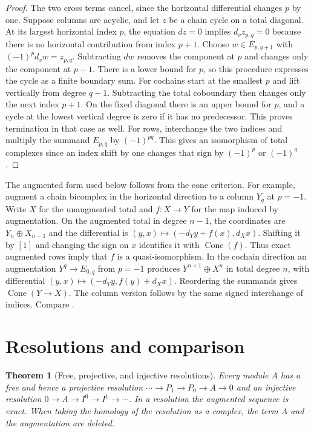 \documentclass[11pt,oneside,openany]{book}
\newtheorem{theorem}{Theorem}[chapter]
\theoremstyle{definition}
\theoremstyle{remark}
\begin{document}
\begin{proof}
The two cross terms cancel, since the horizontal differential
changes \(p\) by one. Suppose columns are acyclic, and let \(z\)
be a chain cycle on a total diagonal. At its largest horizontal
index \(p\), the equation \(dz=0\) implies \(d_vz_{p,q}=0\) because
there is no horizontal contribution from index \(p+1\).
Choose \(w\in E_{p,q+1}\) with
\((-1)^p d_vw=z_{p,q}\). Subtracting \(dw\) removes the component
at \(p\) and changes only the component at \(p-1\).
There is a lower bound for \(p\), so this procedure expresses the
cycle as a finite boundary sum. For cochains start at the smallest
\(p\) and lift vertically from degree \(q-1\). Subtracting the
total coboundary then changes only the next index \(p+1\).
On the fixed diagonal there is an upper bound for \(p\), and a
cycle at the lowest vertical degree is zero if it has no
predecessor. This proves termination in that case as well.
For rows, interchange the two indices and multiply the summand
\(E_{p,q}\) by \((-1)^{pq}\). This gives an isomorphism of total
complexes since an index shift by one changes that sign by
\((-1)^p\) or \((-1)^q\).
\end{proof}

The augmented form used below follows from the cone criterion.
For example, augment a chain bicomplex in the horizontal direction
to a column \(Y_q\) at \(p=-1\). Write \(X\) for the unaugmented
total and \(f:X\to Y\) for the map induced by augmentation. On the
augmented total in degree \(n-1\), the coordinates are
\(Y_n\oplus X_{n-1}\) and the differential is
\((y,x)\mapsto(-d_Yy+f(x),d_Xx)\). Shifting it by \([1]\)
and changing the sign on \(x\) identifies it with
\(\operatorname{Cone}(f)\). Thus exact augmented rows imply that
\(f\) is a quasi-isomorphism. In the cochain direction an
augmentation \(Y^q\to E_{0,q}\) from \(p=-1\) produces
\(Y^{n+1}\oplus X^n\) in total degree \(n\), with differential
\((y,x)\mapsto(-d_Yy,f(y)+d_Xx)\). Reordering the summands gives
\(\operatorname{Cone}(Y\to X)\). The column version follows by the
same signed interchange of indices. Compare
\cite[\S1.2 and Lemma 2.7.3]{weibel}.

\section{Resolutions and comparison}

\begin{theorem}[Free, projective, and injective resolutions]
\label{p103:ALG-10-C02-R01}
Every module \(A\) has a free and hence a projective resolution
\(\cdots\to P_1\to P_0\to A\to0\) and an injective resolution
\(0\to A\to I^0\to I^1\to\cdots\). In a resolution the augmented
sequence is exact. When taking the homology of the resolution as
a complex, the term \(A\) and the augmentation are deleted.
\end{theorem}
\end{document}

